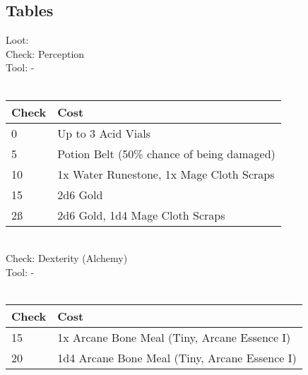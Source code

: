 \subsection{Tables}
Loot:\\
Check: Perception\\
Tool: -\\
\\
\begin{minipage}{0.8\textwidth}
    \begin{tabular}{|l | l|}
        \hline
        Check & Cost\\
        \hline
        0 & Up to 3 Acid Vials\\
        5 & Potion Belt (50\% chance of being damaged)\\
        10 & 1x Water Runestone, 1x Mage Cloth Scraps\\
        15 & 2d6 Gold\\
        2ß & 2d6 Gold, 1d4 Mage Cloth Scraps\\
        \hline
    \end{tabular}
\end{minipage}
\\
Check: Dexterity (Alchemy)\\
Tool: -\\
\\
\begin{minipage}{0.8\textwidth}
    \begin{tabular}{|l | l|}
        \hline
        Check & Cost\\
        \hline
        15 & 1x Arcane Bone Meal (Tiny, Arcane Essence I)\\
        20 & 1d4 Arcane Bone Meal (Tiny, Arcane Essence I)\\
        \hline
    \end{tabular}
\end{minipage}
\pagebreak